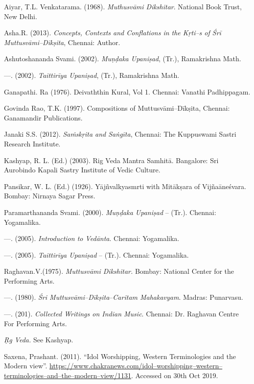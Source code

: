 \begin{thebibliography}{99}
\itemsep=1pt
 Aiyar, T.L. Venkatarama. (1968). \textit{Muthusvāmi Dikshitar}. National Book Trust, New Delhi.

  Asha.R. (2013). \textit{Concepts, Contexts and Conflations in the Kṛti–s of Śrī Muttusvāmi–Dīkṣita}, Chennai: Author.

  Ashutoshananda Svami. (2002). \textit{Muṇḍaka Upaniṣad}, (Tr.), Ramakrishna Math.

  —. (2002). \textit{Taittirīya Upaniṣad}, (Tr.), Ramakrishna Math.

  Ganapathi. Ra (1976). Deivaththin Kural, Vol 1. Chennai: Vanathi Padhippagam.

  Govinda Rao, T.K. (1997). Compositions of Muttusvāmi–Dīkṣita, Chennai: Ganamandir Publications.

  Janaki S.S. (2012). \textit{Saṁskṛita and Saṅgīta}, Chennai: The Kuppuswami Sastri Research Institute.

  Kashyap, R. L. (Ed.) (2003). Rig Veda Mantra Samhitā. Bangalore: Sri Aurobindo Kapali Sastry Institute of Vedic Culture.

  Pansikar, W. L. (Ed.) (1926). Yājñvalkyasmrti with Mitākṣara of Vijñaāneśvara. Bombay: Nirnaya Sagar Press.

  Paramarthananda Svami. (2000). \textit{Muṇḍaka Upaniṣad} – (Tr.). Chennai: Yogamalika.

  —. (2005). \textit{Introduction to Vedānta}. Chennai: Yogamalika.

  —. (2005). \textit{Taittirīya Upaniṣad} – (Tr.). Chennai: Yogamalika.

  Raghavan.V.(1975). \textit{Muttusvāmi Dikshitar.} Bombay: National Center for the Performing Arts.

  —. (1980). \textit{Śri Muttusvāmi–Dīkṣita}–\textit{Caritam Mahakavyam}. Madras: Punarvasu.

  —. (201). \textit{Collected Writings on Indian Music}. Chennai: Dr. Raghavan Centre For Performing Arts.

  \textit{Ṛg Veda.} See Kashyap.

  Saxena, Prashant. (2011). “Idol Worshipping, Western Terminologies and the Modern view”. \url{https://www.chakranews.com/idol–worshipping–western–terminologies–and–the–modern–view/1131}. Accessed on 30th Oct 2019.


\end{thebibliography}
